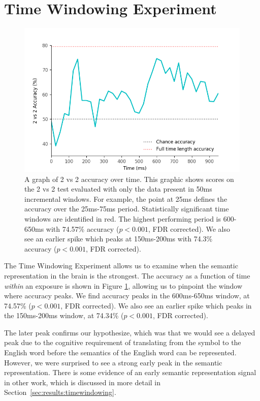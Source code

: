 \section{Time Windowing Experiment} 

\begin{figure}[t]
  \centering
  \includegraphics[width=0.75\linewidth]{figures/timewindow}
  \caption{
    A graph of 2 vs 2 accuracy over time. This graphic shows scores on the 2 vs 
    2 test evaluated with only the data present in 50ms incremental windows.  
    For example, the point at 25ms defines the \tvt accuracy over the 25ms-75ms 
    period. Statistically significant time windows are identified in red. The 
    highest performing period is 600-650ms with 74.57\% accuracy ($p < 0.001$, 
    FDR corrected). We also see an earlier spike which peaks at 150ms-200ms 
    with 74.3\% accuracy ($p < 0.001$, FDR corrected).
  }
  \label{fig:timewindow}
\end{figure}

The Time Windowing Experiment allows us to examine when the semantic 
representation in the brain is the strongest. The \tvt accuracy as a function 
of time \emph{within} an exposure is shown in Figure \ref{fig:timewindow}, 
allowing us to pinpoint the window where accuracy peaks. We find accuracy peaks 
in the 600ms-650ms window, at 74.57\% ($p < 0.001$, FDR corrected). We also see 
an earlier spike which peaks in the 150ms-200ms window, at 74.34\% ($p < 
0.001$, FDR corrected).

The later peak confirms our hypothesize, which was that we would see a delayed
peak due to the cognitive requirement of translating from the symbol to the 
English word before the semantics of the English word can be represented.  
However, we were surprised to see a strong early peak in the semantic 
representation. There is some evidence of an early semantic representation 
signal in other work, which is discussed in more detail in 
Section~\ref{sec:results:timewindowing}.
